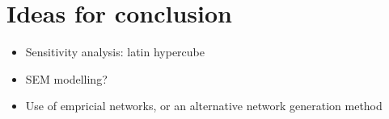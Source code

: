 

\section{Ideas for conclusion}
\label{sec:conc_ideas}

\begin{itemize}
	\item Sensitivity analysis: latin hypercube
	\item SEM modelling?
	\item Use of empricial networks, or an alternative network generation method
\end{itemize}
